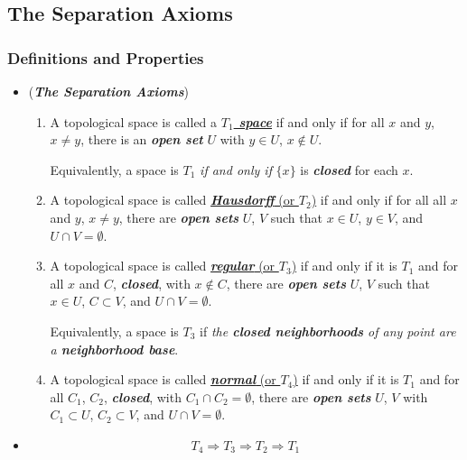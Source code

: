 \documentclass[11pt]{article}
\begin{document}
\subsection{The Separation Axioms}
\subsubsection{Definitions and Properties}
\begin{itemize}
\item \begin{definition} (\textbf{\emph{The Separation Axioms}})
\begin{enumerate}
\item A topological space is called a \underline{\emph{\textbf{$T_1$ space}}} if and only if for all $x$ and $y$, $x\neq y$, there is an \emph{\textbf{open set}} $U$ with $y \in U$, $x \not\in U$. 

Equivalently, a space is $T_1$ \emph{if and only if} $\{x\}$ is \emph{\textbf{closed}} for each $x$.

\item A topological space is called \underline{\emph{\textbf{Hausdorff}} (or $T_2$)} if and only if for all all $x$ and $y$, $x\neq y$, there are \emph{\textbf{open sets}}  $U$,  $V$ such that $x \in U$, $y \in V$, and $U \cap V = \emptyset$.

\item A topological space is called \underline{\emph{\textbf{regular}} (or $T_3$)} if and only if it is $T_1$ and for all $x$ and $C$, \emph{\textbf{closed}}, with $x \not\in C$, there are \emph{\textbf{open sets}} $U$, $V$ such that $x \in U$, $C \subset V$, and $U \cap V = \emptyset$. 

Equivalently, a space is $T_3$ if \emph{the \textbf{closed neighborhoods} of any point are a \textbf{neighborhood base}}.

\item A topological space is called \underline{\emph{\textbf{normal}} (or $T_4$)} if and only if it is $T_1$ and for all $C_1$, $C_2$, \emph{\textbf{closed}}, with $C_1 \cap C_2 = \emptyset$, there are \emph{\textbf{open sets}} $U$, $V$ with $C_1 \subset U$,  $C_2 \subset V$, and $U \cap V = \emptyset$.
\end{enumerate}
\end{definition}

\item \begin{proposition}
\begin{align*}
T_4 \Rightarrow T_3 \Rightarrow T_2 \Rightarrow T_1
\end{align*}
\end{proposition}


\end{itemize}
\end{document}
